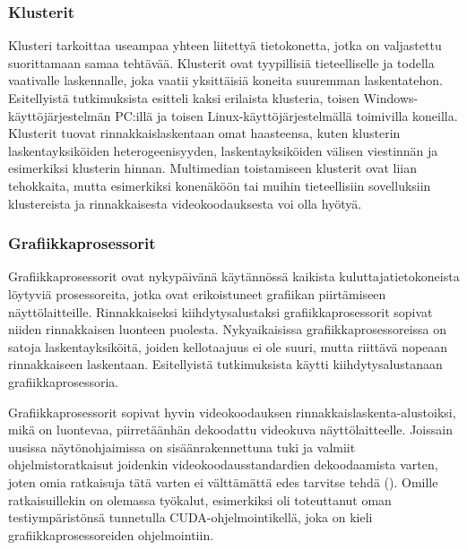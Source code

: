 \subsubsection{Klusterit}

Klusteri tarkoittaa useampaa yhteen liitettyä tietokonetta, jotka on valjastettu
suorittamaan samaa tehtävää. Klusterit ovat tyypillisiä tieteelliselle ja
todella vaativalle laskennalle, joka vaatii yksittäisiä koneita suuremman 
laskentatehon. Esitellyistä tutkimuksista \citealt{li} esitteli kaksi erilaista
klusteria, toisen Windows-käyttöjärjestelmän PC:illä ja toisen
Linux-käyttöjärjestelmällä toimivilla koneilla. Klusterit tuovat 
rinnakkaislaskentaan omat haasteensa, kuten klusterin laskentayksiköiden
heterogeenisyyden, laskentayksiköiden välisen viestinnän ja esimerkiksi
klusterin hinnan. Multimedian toistamiseen klusterit ovat liian tehokkaita,
mutta esimerkiksi konenäköön tai muihin tieteellisiin sovelluksiin klustereista
ja rinnakkaisesta videokoodauksesta voi olla hyötyä.

\subsubsection{Grafiikkaprosessorit}

Grafiikkaprosessorit ovat nykypäivänä käytännössä kaikista
kuluttajatietokoneista löytyviä prosessoreita, jotka ovat erikoistuneet
grafiikan piirtämiseen näyttölaitteille. Rinnakkaiseksi kiihdytysalustaksi
grafiikkaprosessorit sopivat niiden rinnakkaisen luonteen puolesta.
Nykyaikaisissa grafiikkaprosessoreissa on satoja laskentayksiköitä, joiden
kellotaajuus ei ole suuri, mutta riittävä nopeaan rinnakkaiseen laskentaan.
Esitellyistä tutkimuksista \citealt{pieters} käytti kiihdytysalustanaan
grafiikkaprosessoria.

Grafiikkaprosessorit sopivat hyvin videokoodauksen
rinnakkaislaskenta-alustoiksi, mikä on luontevaa, piirretäänhän dekoodattu
videokuva näyttölaitteelle. Joissain uusissa näytönohjaimissa on
sisäänrakennettuna tuki ja valmiit ohjelmistoratkaisut joidenkin videokoodausstandardien dekoodaamista
varten, joten omia ratkaisuja tätä varten ei välttämättä edes tarvitse tehdä (\citealt{nvidia}).
Omille ratkaisuillekin on olemassa työkalut, esimerkiksi \citealt{pieters}
oli toteuttanut oman testiympäristönsä tunnetulla CUDA-ohjelmointikellä, joka
on kieli grafiikkaprosessoreiden ohjelmointiin.



